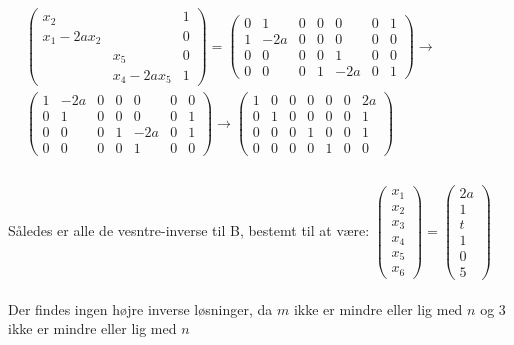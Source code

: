 \documentclass{article}
\begin{document}
$\begin{aligned} & \left(\begin{array}{cc|c}x_2 & & 1 \\ x_1-2 a x_2 & & 0 \\ & x_5 & 0 \\ & x_4-2 a x_5 & 1\end{array}\right)=\left(\begin{array}{cccccc|c}0 & 1 & 0 & 0 & 0 & 0 & 1 \\ 1 & -2 a & 0 & 0 & 0 & 0 & 0 \\ 0 & 0 & 0 & 0 & 1 & 0 & 0 \\ 0 & 0 & 0 & 1 & -2 a & 0 & 1\end{array}\right) \rightarrow \\  & \left(\begin{array}{cccccc|c}1 & -2 a & 0 & 0 & 0 & 0 & 0 \\ 0 & 1 & 0 & 0 & 0 & 0 & 1 \\ 0 & 0 & 0 & 1 & -2 a & 0 & 1 \\ 0 & 0 & 0 & 0 & 1 & 0 & 0\end{array}\right) \rightarrow \left(\begin{array}{cccccc|c}1 & 0 & 0 & 0 & 0 & 0 & 2 a \\ 0 & 1 & 0 & 0 & 0 & 0 & 1 \\ 0 & 0 & 0 & 1 & 0 & 0 & 1 \\ 0 & 0 & 0 & 0 & 1 & 0 & 0\end{array}\right) \\ & \end{aligned}$
\\
\\
Således er alle de vesntre-inverse til B, bestemt til at være:
$\left(\begin{array}{l}x_1 \\ x_2 \\ x_3 \\ x_4 \\ x_5 \\ x_6\end{array}\right)=\left(\begin{array}{c}2 a \\ 1 \\ t \\ 1 \\ 0 \\ 5\end{array}\right)$
\\
\\
Der findes ingen højre inverse løsninger, da $m$ ikke er mindre eller lig med $n$ og $3$ ikke er mindre eller lig med $n$
\end{document}
